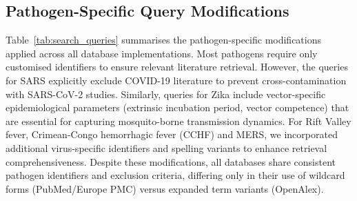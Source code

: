 \subsection{Pathogen-Specific Query Modifications}

Table~\ref{tab:search_queries} summarises the pathogen-specific modifications applied across all database implementations. Most pathogens require only customised identifiers to ensure relevant literature retrieval. However, the queries for SARS explicitly exclude COVID-19 literature to prevent cross-contamination with SARS-CoV-2 studies. Similarly, queries for Zika include vector-specific epidemiological parameters (extrinsic incubation period, vector competence) that are essential for capturing mosquito-borne transmission dynamics. For Rift Valley fever, Crimean-Congo hemorrhagic fever (CCHF) and MERS, we incorporated additional virus-specific identifiers and spelling variants to enhance retrieval comprehensiveness. Despite these modifications, all databases share consistent pathogen identifiers and exclusion criteria, differing only in their use of wildcard forms (PubMed/Europe PMC) versus expanded term variants (OpenAlex).


